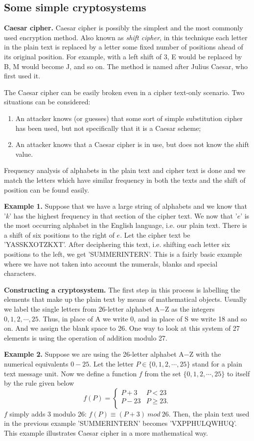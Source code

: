 \documentclass[12pt]{article}
\begin{document}
         \subsection{Some simple cryptosystems}
\textbf{Caesar cipher.} Caesar cipher is possibly the simplest and the most commonly used encryption method. Also known as \textit{shift cipher}, in this technique each letter in the plain text is replaced by a letter some fixed number of positions ahead of its original position. For example, with a left shift of 3, E would be replaced by B, M would become J, and so on. The method is named after Julius Caesar, who first used it.

The Caesar cipher can be easily broken even in a cipher text-only scenario. Two situations can be considered:
\begin{enumerate}
\item An attacker knows (or guesses) that some sort of simple substitution cipher has been used, but not specifically that it is a Caesar scheme;
\item An attacker knows that a Caesar cipher is in use, but does not know the shift value.
\end{enumerate}
Frequency analysis of alphabets in the plain text and cipher text is done and we match the letters which have similar frequency in both the texts and the shift of position can be found easily.

\textbf{Example 1.} Suppose that we have a large string of alphabets and we know that '$k$' has the highest frequency in that section of the cipher text. We now that '$e$' is the most occurring alphabet in the English language, i.e. our plain text. There is a shift of six positions to the right of $e$. Let the cipher text be 'YASSKXOTZKXT'. After deciphering this text, i.e. shifting each letter six positions to the left, we get 'SUMMERINTERN'. This is a fairly basic example where we have not taken into account the numerals, blanks and special characters.

\textbf{Constructing a cryptosystem.} The first step in this process is labelling the elements that make up the plain text by means of mathematical objects. Usually we label the single letters from 26-letter alphabet A$-$Z as the integers $0,1,2,\cdots,25.$ Thus, in place of A we write 0, and in place of S we write 18 and so on. And we assign the blank space to 26. One way to look at this system of 27 elements is using the operation of addition modulo 27.

\textbf{Example 2.} Suppose we are using the 26-letter alphabet A$-$Z with the numerical equivalents $0-25$. Let the letter $P \in \{0,1,2,\cdots , 25\}$ stand for a plain text message unit. Now we define a function $f$ from the set  $\{0,1,2,\cdots , 25\}$ to itself by the rule given below
$$f(P)=    \left\{
\begin{array}{ll}
      P+3 & P < 23 \\
      P-23 & P\geq 23. \\
\end{array}
\right. $$
$f$ simply adds 3 modulo 26: $f(P)\equiv (P+3) \: mod \: 26$. Then, the plain text used in the previous example 'SUMMERINTERN' becomes 'VXPPHULQWHUQ'. This example illustrates Caesar cipher in a more mathematical way.
\end{document}
